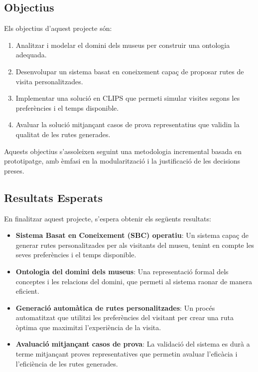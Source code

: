 \documentclass[a4paper]{article}
\begin{document}
	\subsection{Objectius}
	
	Els objectius d’aquest projecte són:
	\begin{enumerate}
		\item Analitzar i modelar el domini dels museus per construir una ontologia adequada.
		\item Desenvolupar un sistema basat en coneixement capaç de proposar rutes de visita personalitzades.
		\item Implementar una solució en CLIPS que permeti simular visites segons les preferències i el temps disponible.
		\item Avaluar la solució mitjançant casos de prova representatius que validin la qualitat de les rutes generades.
	\end{enumerate}
	Aquests objectius s’assoleixen seguint una metodologia incremental basada en prototipatge, amb èmfasi en la modularització i la justificació de les decisions preses.
	
	\subsection{Resultats Esperats}
	
	En finalitzar aquest projecte, s’espera obtenir els següents resultats:
	
	\begin{itemize}
		\item \textbf{Sistema Basat en Coneixement (SBC) operatiu}: Un sistema capaç de generar rutes personalitzades per als visitants del museu, tenint en compte les seves preferències i el temps disponible.
		
		\item \textbf{Ontologia del domini dels museus}: Una representació formal dels conceptes i les relacions del domini, que permeti al sistema raonar de manera eficient.
		
		\item \textbf{Generació automàtica de rutes personalitzades}: Un procés automatitzat que utilitzi les preferències del visitant per crear una ruta òptima que maximitzi l'experiència de la visita.
		
		\item \textbf{Avaluació mitjançant casos de prova}: La validació del sistema es durà a terme mitjançant proves representatives que permetin avaluar l'eficàcia i l'eficiència de les rutes generades.
	\end{itemize}
	
\end{document}
